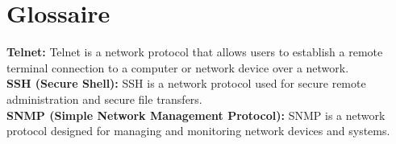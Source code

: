 \chapter{Glossaire}
\label{chap:Glossary} 


\hspace{16pt}\textbf{Telnet:} Telnet is a network protocol that allows users to establish a remote terminal connection to a computer or network device over a network.\\


\textbf{SSH (Secure Shell):} SSH is a network protocol used for secure remote administration and secure file transfers.\\


\textbf{SNMP (Simple Network Management Protocol):} SNMP is a network protocol designed for managing and monitoring network devices and systems.\\


\pagebreak
